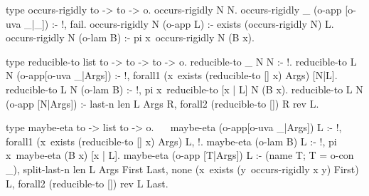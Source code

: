   type occurs-rigidly to -> to -> o.
  occurs-rigidly N N.
  occurs-rigidly _ (o-app [o-uva _|_]) :- !, fail.
  occurs-rigidly N (o-app L) :- exists (occurs-rigidly N) L.
  occurs-rigidly N (o-lam B) :- pi x\ occurs-rigidly N (B x).

  type reducible-to list to -> to -> to -> o.
  reducible-to _ N N :- !.
  reducible-to L N (o-app[o-uva _|Args]) :- !, 
    forall1 (x\ exists (reducible-to [] x) Args) [N|L]. 
  reducible-to L N (o-lam B) :- !, 
    pi x\ reducible-to [x | L] N (B x).
  reducible-to L N (o-app [N|Args]) :-
    last-n {len L} Args R,
    forall2 (reducible-to []) R {rev L}.

  type maybe-eta to -> list to -> o.                  ~~
  maybe-eta (o-app[o-uva _|Args]) L :- !,
    forall1 (x\ exists (reducible-to [] x) Args) L, !. 
  maybe-eta (o-lam B) L :- !, pi x\ maybe-eta (B x) [x | L].
  maybe-eta (o-app [T|Args]) L :- (name T; T = o-con _),
    split-last-n {len L} Args First Last,
    none (x\ exists (y\ occurs-rigidly x y) First) L,
    forall2 (reducible-to []) {rev L} Last.
